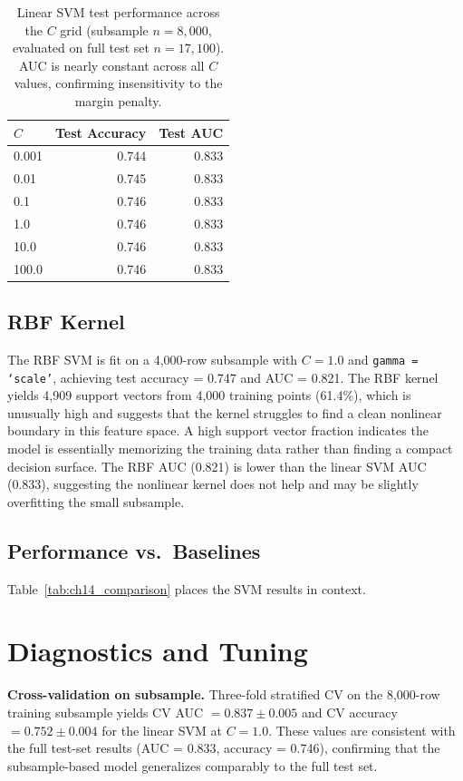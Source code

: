 \documentclass[12pt, oneside]{book}
\begin{document}
\begin{table}[H]
\centering
\caption{Linear SVM test performance across the $C$ grid (subsample $n = 8{,}000$, evaluated on full test set $n = 17{,}100$). AUC is nearly constant across all $C$ values, confirming insensitivity to the margin penalty.}
\label{tab:ch10_linear_c}
\begin{tabular}{lrr}
\toprule
\textbf{$C$} & \textbf{Test Accuracy} & \textbf{Test AUC} \\
\midrule
0.001  & 0.744 & 0.833 \\
0.01   & 0.745 & 0.833 \\
0.1    & 0.746 & 0.833 \\
1.0    & 0.746 & 0.833 \\
10.0   & 0.746 & 0.833 \\
100.0  & 0.746 & 0.833 \\
\bottomrule
\end{tabular}
\end{table}
 
\subsection{RBF Kernel}
 
The RBF SVM is fit on a 4{,}000-row subsample with $C = 1.0$ and \texttt{gamma = `scale'}, achieving test accuracy = 0.747 and AUC = 0.821. The RBF kernel yields 4{,}909 support vectors from 4{,}000 training points (61.4\%), which is unusually high and suggests that the kernel struggles to find a clean nonlinear boundary in this feature space. A high support vector fraction indicates the model is essentially memorizing the training data rather than finding a compact decision surface. The RBF AUC (0.821) is lower than the linear SVM AUC (0.833), suggesting the nonlinear kernel does not help and may be slightly overfitting the small subsample.
 
\subsection{Performance vs.\ Baselines}
 
Table~\ref{tab:ch14_comparison} places the SVM results in context.
 
 
\section{Diagnostics and Tuning}
 
\textbf{Cross-validation on subsample.} Three-fold stratified CV on the 8{,}000-row training subsample yields CV AUC $= 0.837 \pm 0.005$ and CV accuracy $= 0.752 \pm 0.004$ for the linear SVM at $C = 1.0$. These values are consistent with the full test-set results (AUC = 0.833, accuracy = 0.746), confirming that the subsample-based model generalizes comparably to the full test set.
 
\end{document}
